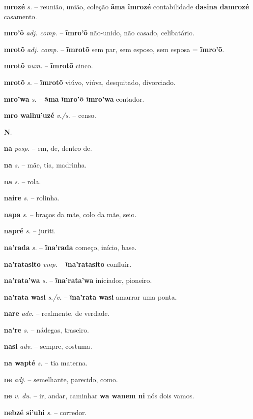 \textbf{mrozé} \textit{s.} -- reunião, união, coleção  \textbf{ãma ĩmrozé} contabilidade  \textbf{dasina damrozé} casamento.

\textbf{mro'õ} \textit{adj. comp.} -- \textbf{ĩmro'õ} não-unido, não casado, celibatário.

\textbf{mrotõ} \textit{adj. comp.} -- \textbf{ĩmrotõ} sem par, sem esposo, sem esposa = \textbf{ĩmro'õ}.

\textbf{mrotõ} \textit{num.} -- \textbf{ĩmrotõ} cinco.

\textbf{mrotõ} \textit{s.} -- \textbf{ĩmrotõ} viúvo, viúva, desquitado, divorciado.

\textbf{mro'wa} \textit{s.} -- \textbf{ãma ĩmro'õ ĩmro'wa} contador.

\textbf{mro waihu'uzé} \textit{v./s.} -- censo.



\textbf{N}.



\textbf{na} \textit{posp.} -- em, de, dentro de.

\textbf{na} \textit{s.} -- mãe, tia, madrinha.

\textbf{na} \textit{s.} -- rola.

\textbf{naire} \textit{s.} -- rolinha.

\textbf{napa} \textit{s.} -- braços da mãe, colo da mãe, seio.

\textbf{napré} \textit{s.} -- juriti.

\textbf{na'rada} \textit{s.} -- \textbf{ĩna'rada} começo, início, base.

\textbf{na'ratasito} \textit{vmp.} -- \textbf{ĩna'ratasito} confluir.

\textbf{na'rata'wa} \textit{s.} -- \textbf{ĩna'rata'wa} iniciador, pioneiro.

\textbf{na'rata wasi} \textit{s./v.} -- \textbf{ĩna'rata wasi} amarrar uma ponta.

\textbf{nare} \textit{adv.} -- realmente, de verdade.

\textbf{na're} \textit{s.} -- nádegas, traseiro.

\textbf{nasi} \textit{adv.} -- sempre, costuma.

\textbf{na wapté} \textit{s.} -- tia materna.

\textbf{ne} \textit{adj.} -- semelhante, parecido, como.

\textbf{ne} \textit{v. du.} -- ir, andar, caminhar  \textbf{wa wanem ni} nós dois vamos.

\textbf{nebzé si'uhi} \textit{s.} -- corredor.

